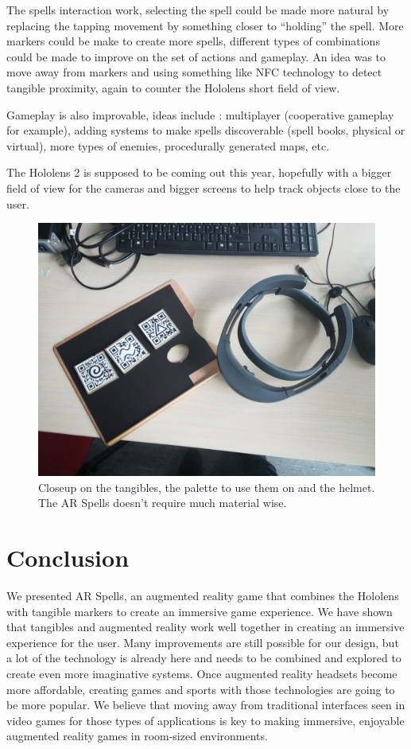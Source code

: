 \documentclass[sigchi, authorversion, screen]{acmart}
\begin{document}
The spells interaction work, selecting the spell could be made more natural by replacing the tapping movement by something closer to “holding” the spell. More markers could be make to create more spells, different types of combinations could be made to improve on the set of actions and gameplay. An idea was to move away from markers and using something like NFC technology to detect tangible proximity, again to counter the Hololens short field of view.

Gameplay is also improvable, ideas include : multiplayer (cooperative gameplay for example), adding systems to make spells discoverable (spell books, physical or virtual), more types of enemies, procedurally generated maps, etc.

The Hololens 2 is supposed to be coming out this year, hopefully with a bigger field of view for the cameras and bigger screens to help track objects close to the user.

\begin{figure}
    \includegraphics[height=0.35\textwidth]{Images/tangibles+helmet.jpg}
    \caption{Closeup on the tangibles, the palette to use them on and the helmet. The AR Spells doesn't require much material wise.}
    \label{fig:tangibles_helmet}
\end{figure}

\section{Conclusion}

We presented AR Spells, an augmented reality game that combines the Hololens with tangible markers to create an immersive game experience. We have shown that tangibles and augmented reality work well together in creating an immersive experience for the user. Many improvements are still possible for our design, but a lot of the technology is already here and needs to be combined and explored to create even more imaginative systems. Once augmented reality headsets become more affordable, creating games and sports with those technologies are going to be more popular. We believe that moving away from traditional interfaces seen in video games for those types of applications is key to making immersive, enjoyable augmented reality games in room-sized environments.
\end{document}

